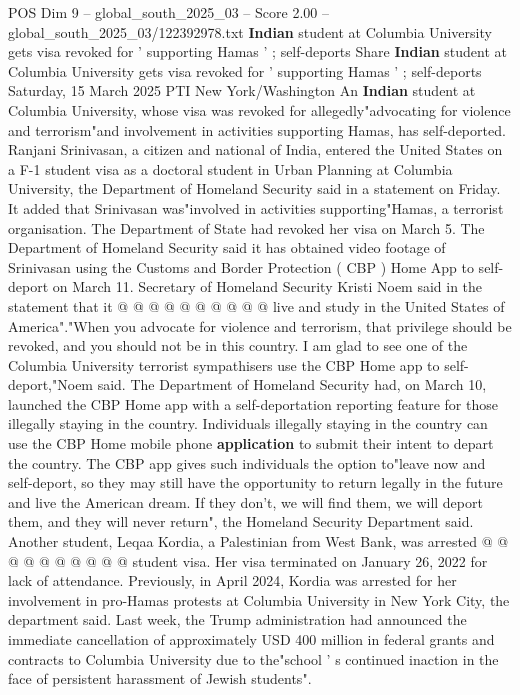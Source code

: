 \begin{textsample}{POS Dim 9 – global\_south\_2025\_03 – Score 2.00 – global\_south\_2025\_03/122392978.txt}  \label{ex:f9_pos_047}
\textbf{Indian} student at Columbia University gets visa revoked for ' supporting Hamas ' ; self-deports Share \textbf{Indian} student at Columbia University gets visa revoked for ' supporting Hamas ' ; self-deports Saturday, 15 March 2025 PTI New York/Washington An \textbf{Indian} student at Columbia University, whose visa was revoked for allegedly"advocating for violence and terrorism"and involvement in activities supporting Hamas, has self-deported.
Ranjani Srinivasan, a citizen and national of India, entered the United States on a F-1 student visa as a doctoral student in Urban Planning at Columbia University, the Department of Homeland Security said in a statement on Friday.
It added that Srinivasan was"involved in activities supporting"Hamas, a terrorist organisation.
The Department of State had revoked her visa on March 5.
The Department of Homeland Security said it has obtained video footage of Srinivasan using the Customs and Border Protection ( CBP ) Home App to self-deport on March 11.
Secretary of Homeland Security Kristi Noem said in the statement that it @ @ @ @ @ @ @ @ @ @ live and study in the United States of America"."When you advocate for violence and terrorism, that privilege should be revoked, and you should not be in this country.
I am glad to see one of the Columbia University terrorist sympathisers use the CBP Home app to self-deport,"Noem said.
The Department of Homeland Security had, on March 10, launched the CBP Home app with a self-deportation reporting feature for those illegally staying in the country.
Individuals illegally staying in the country can use the CBP Home mobile phone \textbf{application} to submit their intent to depart the country.
The CBP app gives such individuals the option to"leave now and self-deport, so they may still have the opportunity to return legally in the future and live the American dream.
If they don't, we will find them, we will deport them, and they will never return", the Homeland Security Department said.
Another student, Leqaa Kordia, a Palestinian from West Bank, was arrested @ @ @ @ @ @ @ @ @ @ student visa.
Her visa terminated on January 26, 2022 for lack of attendance.
Previously, in April 2024, Kordia was arrested for her involvement in pro-Hamas protests at Columbia University in New York City, the department said.
Last week, the Trump administration had announced the immediate cancellation of approximately USD 400 million in federal grants and contracts to Columbia University due to the"school ' s continued inaction in the face of persistent harassment of Jewish students".

\end{textsample}
